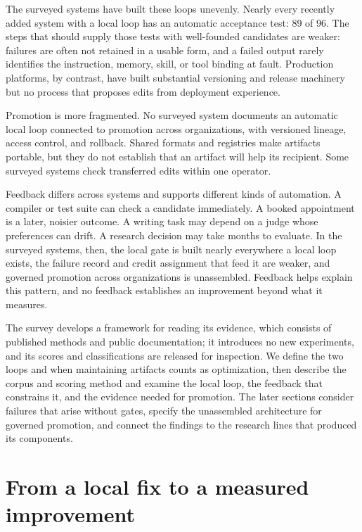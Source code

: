 The surveyed systems have built these loops unevenly. Nearly every recently added system with a local loop has an automatic acceptance test: 89 of 96. The steps that should supply those tests with well-founded candidates are weaker: failures are often not retained in a usable form, and a failed output rarely identifies the instruction, memory, skill, or tool binding at fault. Production platforms, by contrast, have built substantial versioning and release machinery but no process that proposes edits from deployment experience.

Promotion is more fragmented. No surveyed system documents an automatic local loop connected to promotion across organizations, with versioned lineage, access control, and rollback. Shared formats and registries make artifacts portable, but they do not establish that an artifact will help its recipient. Some surveyed systems check transferred edits within one operator.

Feedback differs across systems and supports different kinds of automation. A compiler or test suite can check a candidate immediately. A booked appointment is a later, noisier outcome. A writing task may depend on a judge whose preferences can drift. A research decision may take months to evaluate. In the surveyed systems, then, the local gate is built nearly everywhere a local loop exists, the failure record and credit assignment that feed it are weaker, and governed promotion across organizations is unassembled. Feedback helps explain this pattern, and no feedback establishes an improvement beyond what it measures.

The survey develops a framework for reading its evidence, which consists of published methods and public documentation; it introduces no new experiments, and its scores and classifications are released for inspection. We define the two loops and when maintaining artifacts counts as optimization, then describe the corpus and scoring method and examine the local loop, the feedback that constrains it, and the evidence needed for promotion. The later sections consider failures that arise without gates, specify the unassembled architecture for governed promotion, and connect the findings to the research lines that produced its components.

\section{From a local fix to a measured improvement}\label{sec:loop}

